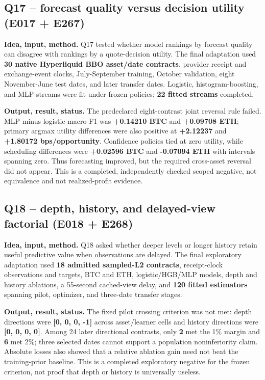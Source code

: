 \documentclass[10pt,a4paper]{article}
\begin{document}
\subsection{Q17 -- forecast quality versus decision utility (E017 + E267)}
\textbf{Idea, input, method.} Q17 tested whether model rankings by forecast quality can disagree with rankings by a quote-decision utility. The final adaptation used \textbf{30 native Hyperliquid BBO asset/date contracts}, provider receipt and exchange-event clocks, July-September training, October validation, eight November-June test dates, and later transfer dates. Logistic, histogram-boosting, and MLP streams were fit under frozen policies; \textbf{22 fitted streams} completed.\par
\textbf{Output, result, status.} The predeclared eight-contrast joint reversal rule failed. MLP minus logistic macro-F1 was \textbf{+0.14210 BTC} and \textbf{+0.09708 ETH}; primary argmax utility differences were also positive at \textbf{+2.12237} and \textbf{+1.80172 bps/opportunity}. Confidence policies tied at zero utility, while scheduling differences were \textbf{+0.02596 BTC} and \textbf{-0.07094 ETH} with intervals spanning zero. Thus forecasting improved, but the required cross-asset reversal did not appear. This is a completed, independently checked scoped negative, not equivalence and not realized-profit evidence.\par
\subsection{Q18 -- depth, history, and delayed-view factorial (E018 + E268)}
\textbf{Idea, input, method.} Q18 asked whether deeper levels or longer history retain useful predictive value when observations are delayed. The final exploratory adaptation used \textbf{18 admitted sampled-L2 contracts}, receipt-clock observations and targets, BTC and ETH, logistic/HGB/MLP models, depth and history ablations, a 55-second cached-view delay, and \textbf{120 fitted estimators} spanning pilot, optimizer, and three-date transfer stages.\par
\textbf{Output, result, status.} The fixed pilot crossing criterion was not met: depth directions were \textbf{[0, 0, 0, -1]} across asset/learner cells and history directions were \textbf{[0, 0, 0, 0]}. Among 24 later directional contrasts, only \textbf{2} met the 1\% margin and \textbf{6} met 2\%; three selected dates cannot support a population noninferiority claim. Absolute losses also showed that a relative ablation gain need not beat the training-prior baseline. This is a completed exploratory negative for the frozen criterion, not proof that depth or history is universally useless.\par
\end{document}

